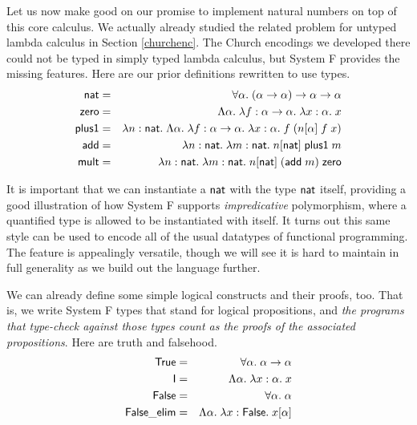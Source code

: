 \documentclass{amsbook}
\theoremstyle{definition}
\theoremstyle{remark}
\numberwithin{section}{chapter}
\numberwithin{equation}{chapter}
\begin{document}
Let us now make good on our promise to implement natural numbers on top of this core calculus.
We actually already studied the related problem for untyped lambda calculus in Section \ref{churchenc}.
The Church encodings we developed there could not be typed in simply typed lambda calculus, but System F provides the missing features.
Here are our prior definitions rewritten to use types.
\begin{eqnarray*}
  \mathsf{nat} &=& \forall \alpha. \; (\alpha \to \alpha) \to \alpha \to \alpha \\
  \mathsf{zero} &=& \Lambda \alpha. \; \lambda f : \alpha \to \alpha. \; \lambda x : \alpha. \; x \\
  \mathsf{plus1} &=& \lambda n : \mathsf{nat}. \; \Lambda \alpha. \; \lambda f : \alpha \to \alpha. \; \lambda x : \alpha. \; f \; (n[\alpha] \; f \; x) \\
  \mathsf{add} &=& \lambda n : \mathsf{nat}. \; \lambda m : \mathsf{nat}. \; n[\mathsf{nat}] \; \mathsf{plus1} \; m \\
  \mathsf{mult} &=& \lambda n : \mathsf{nat}. \; \lambda m : \mathsf{nat}. \; n[\mathsf{nat}] \; (\mathsf{add} \; m) \; \mathsf{zero}
\end{eqnarray*}

It is important that we can instantiate a $\mathsf{nat}$ with the type $\mathsf{nat}$ itself, providing a good illustration of how System F supports \emph{impredicative} polymorphism, where a quantified type is allowed to be instantiated with itself.
It turns out this same style can be used to encode all of the usual datatypes of functional programming.
The feature is appealingly versatile, though we will see it is hard to maintain in full generality as we build out the language further.

We can already define some simple logical constructs and their proofs, too.
That is, we write System F types that stand for logical propositions, and \emph{the programs that type-check against those types count as the proofs of the associated propositions}.
Here are truth and falsehood.
\begin{eqnarray*}
  \mathsf{True} &=& \forall \alpha. \; \alpha \to \alpha \\
  \mathsf{I} &=& \Lambda \alpha. \; \lambda x : \alpha. \; x \\
  \mathsf{False} &=& \forall \alpha. \; \alpha \\
  \mathsf{False\_elim} &=& \Lambda \alpha. \; \lambda x : \mathsf{False}. \; x[\alpha]
\end{eqnarray*}
\end{document}
